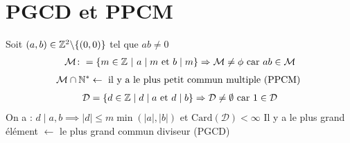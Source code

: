 \section{PGCD et PPCM}
\begin{definition}
Soit $(a, b) \in \mathbb{Z}^2 \backslash \{(0, 0)\}$ tel que $ab \neq 0$
\begin{align*}
\mathcal{M} \colon = \left\{ m \in \mathbb{Z} \ | \ a \mid m \text{ et } b \mid m \right\} \Rightarrow \mathcal{M} \neq \phi \text{ car } ab \in \mathcal{M}
\end{align*}
\begin{align*}
\mathcal{M} \cap \mathbb{N}^* \leftarrow \text{ il y a le plus petit commun multiple (PPCM) }
\end{align*}
\begin{align*}
\mathcal{D} = \left\{ d \in \mathbb{Z} \mid d \mid a \text{ et } d \mid b \right\} \Rightarrow \mathcal{D} \neq \emptyset \text{ car } 1 \in \mathcal{D}
\end{align*}
On a : $d \mid a, b \implies |d| \leq m \min (|a|, |b|)$ et $\mathrm{Card}(\mathcal{D}) < \infty$
Il y a le plus grand élément $\leftarrow$ le plus grand commun diviseur (PGCD)
\end{definition}